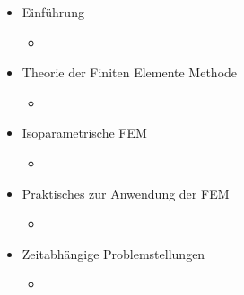 \documentclass[letterpaper,10pt,german]{jupyterBook}
\begin{document}
\begin{itemize}
\item {} 
\sphinxAtStartPar
Einführung

\begin{itemize}
\item {} 
\sphinxAtStartPar
{\hyperref[\detokenize{chapters/chapter1/Einf_xfchrung_Konstruktion::doc}]{}}

\end{itemize}
\end{itemize}
\begin{itemize}
\item {} 
\sphinxAtStartPar
Theorie der Finiten Elemente Methode

\begin{itemize}
\item {} 
\sphinxAtStartPar
{\hyperref[\detokenize{chapters/chapter2/overview::doc}]{}}

\end{itemize}
\end{itemize}
\begin{itemize}
\item {} 
\sphinxAtStartPar
Isoparametrische FEM

\begin{itemize}
\item {} 
\sphinxAtStartPar
{\hyperref[\detokenize{chapters/chapter3/isoparametrischeFEM::doc}]{}}

\end{itemize}
\end{itemize}
\begin{itemize}
\item {} 
\sphinxAtStartPar
Praktisches zur Anwendung der FEM

\begin{itemize}
\item {} 
\sphinxAtStartPar
{\hyperref[\detokenize{chapters/chapter4/Overview::doc}]{}}

\end{itemize}
\end{itemize}
\begin{itemize}
\item {} 
\sphinxAtStartPar
Zeitabhängige Problemstellungen

\begin{itemize}
\item {} 
\sphinxAtStartPar
{\hyperref[\detokenize{chapters/chapter6/Overview::doc}]{}}

\end{itemize}
\end{itemize}
\end{document}

